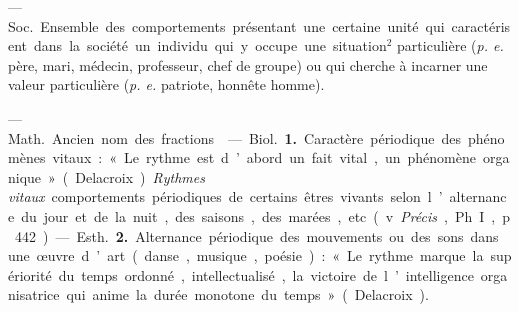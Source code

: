 \begin{itemize}[leftmargin=1cm, label=, itemsep=1pt]
 —  \si{Soc.} Ensemble des comportements
présentant une certaine unité qui caractérisent dans la société un individu
qui y occupe une situation$^2$ particulière ({\it p. e.} père, mari, médecin,
professeur, chef de groupe) ou qui cherche à incarner une valeur particulière
({\it p. e.} patriote, honnête homme).

 — \si{Math.} Ancien nom des fractions.

 — \si{Biol.} {\bf 1.} Caractère périodique des phénomènes
vitaux : « Le rythme est d’abord un fait vital, un phénomène organique
» (Delacroix). {\it Rythmes vitaux} comportements périodiques de certains
êtres vivants selon l’alternance du jour et de la nuit, des saisons, des
marées, etc. (v. {\it Précis}, Ph. I, p. 442).

— \si{Esth.} {\bf 2.} Alternance périodique des mouvements ou des sons dans
une œuvre d’art (danse, musique, poésie) : « Le rythme marque la supériorité
du temps ordonné, intellectualisé, la victoire de l’intelligence
organisatrice qui anime la durée monotone du temps » (Delacroix).

	\end{itemize}
